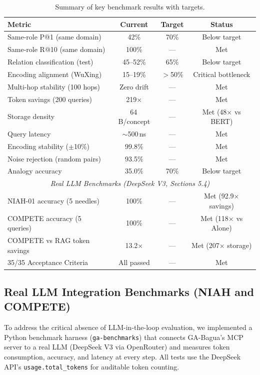 \documentclass[11pt,a4paper]{article}
\begin{document}
\begin{table}[ht]
\centering
\caption{Summary of key benchmark results with targets.}
\label{tab:summary}
\begin{tabular}{lccc}
\toprule
\textbf{Metric} & \textbf{Current} & \textbf{Target} & \textbf{Status} \\
\midrule
Same-role P@1 (same domain)      &   42\%   &  70\%   & Below target \\
Same-role R@10 (same domain)     &  100\%   &  ---    & Met \\
Relation classification (test)   &  45--52\% & 65\%   & Below target \\
Encoding alignment (WuXing)      &  15--19\% & $>$50\% & Critical bottleneck \\
Multi-hop stability (100 hops)   &  Zero drift & ---  & Met \\
Token savings (200 queries)      &  219$\times$ & --- & Met \\
Storage density                  &  64\,B/concept & --- & Met (48$\times$ vs BERT) \\
Query latency                    &  $\sim$500\,ns & --- & Met \\
Encoding stability ($\pm$10\%)   &  99.8\%   & ---    & Met \\
Noise rejection (random pairs)   &  93.5\%   & ---    & Met \\
Analogy accuracy                 &  35.0\%   &  70\%   & Below target \\
\midrule
\multicolumn{4}{c}{\textit{Real LLM Benchmarks (DeepSeek V3, Sections 5.4)}} \\
\midrule
NIAH-01 accuracy (5 needles)     & 100\%     & --- & Met (92.9$\times$ savings) \\
COMPETE accuracy (5 queries)     & 100\%     & --- & Met (118$\times$ vs Alone) \\
COMPETE vs RAG token savings     & 13.2$\times$ & --- & Met (207$\times$ storage) \\
35/35 Acceptance Criteria        & All passed & --- & Met \\
\bottomrule
\end{tabular}
\end{table}

\subsection{Real LLM Integration Benchmarks (NIAH and COMPETE)}

To address the critical absence of LLM-in-the-loop evaluation, we implemented
a Python benchmark harness (\texttt{ga-benchmarks}) that connects GA-Bagua's
MCP server to a real LLM (DeepSeek V3 via OpenRouter) and measures token
consumption, accuracy, and latency at every step. All tests use the DeepSeek
API's \texttt{usage.total\_tokens} for auditable token counting.
\end{document}
